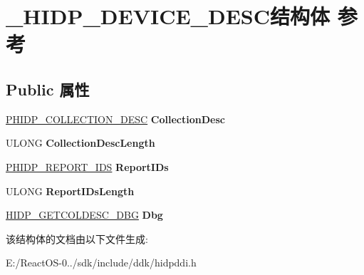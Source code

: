 \hypertarget{struct___h_i_d_p___d_e_v_i_c_e___d_e_s_c}{}\section{\+\_\+\+H\+I\+D\+P\+\_\+\+D\+E\+V\+I\+C\+E\+\_\+\+D\+E\+S\+C结构体 参考}
\label{struct___h_i_d_p___d_e_v_i_c_e___d_e_s_c}
\subsection*{Public 属性}
\begin{DoxyCompactItemize}
\item 
\mbox{\label{struct___h_i_d_p___d_e_v_i_c_e___d_e_s_c_a3f732c7da403a967da96f0145faa271c}} 
\hyperlink{struct___h_i_d_p___c_o_l_l_e_c_t_i_o_n___d_e_s_c}{P\+H\+I\+D\+P\+\_\+\+C\+O\+L\+L\+E\+C\+T\+I\+O\+N\+\_\+\+D\+E\+SC} {\bfseries Collection\+Desc}
\item 
\mbox{\label{struct___h_i_d_p___d_e_v_i_c_e___d_e_s_c_a9b3b2ab6d71b831c261ccd10d6a61721}} 
U\+L\+O\+NG {\bfseries Collection\+Desc\+Length}
\item 
\mbox{\label{struct___h_i_d_p___d_e_v_i_c_e___d_e_s_c_ad8fa188e77e2f95471353865657d19dc}} 
\hyperlink{struct___h_i_d_p___r_e_p_o_r_t___i_d_s}{P\+H\+I\+D\+P\+\_\+\+R\+E\+P\+O\+R\+T\+\_\+\+I\+DS} {\bfseries Report\+I\+Ds}
\item 
\mbox{\label{struct___h_i_d_p___d_e_v_i_c_e___d_e_s_c_a7f3ed5c0f870343fbd5c3bcaa35d96d6}} 
U\+L\+O\+NG {\bfseries Report\+I\+Ds\+Length}
\item 
\mbox{\label{struct___h_i_d_p___d_e_v_i_c_e___d_e_s_c_a5656087b77e07d553dfdc0598d7fc9f1}} 
\hyperlink{struct___h_i_d_p___g_e_t_c_o_l_d_e_s_c___d_b_g}{H\+I\+D\+P\+\_\+\+G\+E\+T\+C\+O\+L\+D\+E\+S\+C\+\_\+\+D\+BG} {\bfseries Dbg}
\end{DoxyCompactItemize}


该结构体的文档由以下文件生成\+:\begin{DoxyCompactItemize}
\item 
E\+:/\+React\+O\+S-\/0../sdk/include/ddk/hidpddi.\+h\end{DoxyCompactItemize}
